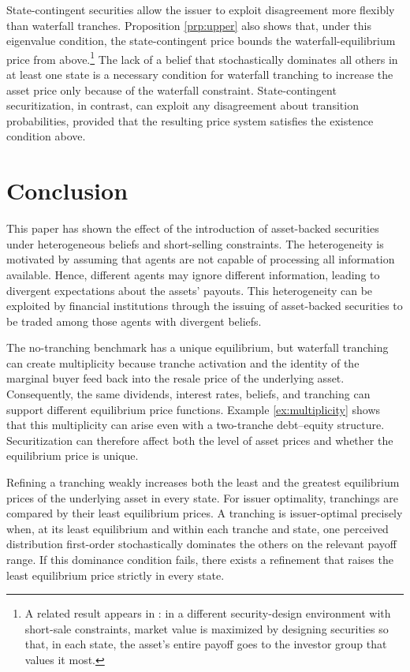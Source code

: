 \documentclass[11pt]{article}
\theoremstyle{plain}
\begin{document}
State-contingent securities allow the issuer to exploit disagreement more flexibly than waterfall tranches. Proposition \ref{prp:upper} also shows that, under this eigenvalue condition, the state-contingent price bounds the waterfall-equilibrium price from above.\footnote{A related result appears in \cite{AllenGale1988}: in a different security-design environment with short-sale constraints, market value is maximized by designing securities so that, in each state, the asset's entire payoff goes to the investor group that values it most.} The lack of a belief that stochastically dominates all others in at least one state is a necessary condition for waterfall tranching to increase the asset price only because of the waterfall constraint. State-contingent securitization, in contrast, can exploit any disagreement about transition probabilities, provided that the resulting price system satisfies the existence condition above.

\section{Conclusion} \label{sec:disc}

This paper has shown the effect of the introduction of asset-backed securities under heterogeneous beliefs and short-selling constraints. The heterogeneity is motivated by assuming that agents are not capable of processing all information available. Hence, different agents may ignore different information, leading to divergent expectations about the assets' payouts. This heterogeneity can be exploited by financial institutions through the issuing of asset-backed securities to be traded among those agents with divergent beliefs.

The no-tranching benchmark has a unique equilibrium, but waterfall tranching can create multiplicity because tranche activation and the identity of the marginal buyer feed back into the resale price of the underlying asset. Consequently, the same dividends, interest rates, beliefs, and tranching can support different equilibrium price functions. Example \ref{ex:multiplicity} shows that this multiplicity can arise even with a two-tranche debt--equity structure. Securitization can therefore affect both the level of asset prices and whether the equilibrium price is unique.

Refining a tranching weakly increases both the least and the greatest equilibrium prices of the underlying asset in every state. For issuer optimality, tranchings are compared by their least equilibrium prices. A tranching is issuer-optimal precisely when, at its least equilibrium and within each tranche and state, one perceived distribution first-order stochastically dominates the others on the relevant payoff range. If this dominance condition fails, there exists a refinement that raises the least equilibrium price strictly in every state.
\end{document}
